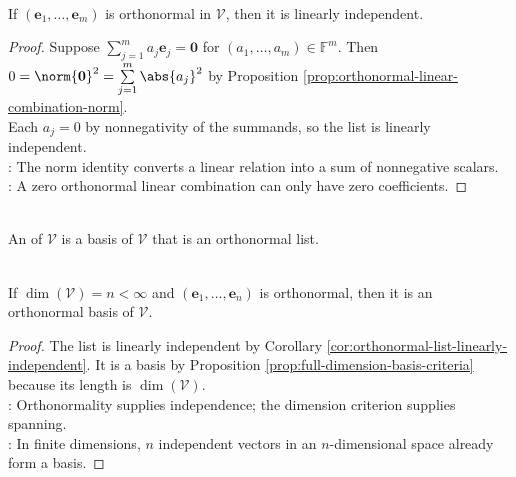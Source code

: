 \begin{corollary} \label{cor:orthonormal-list-linearly-independent} \\
If $(\mathbf{e}_1,\ldots,\mathbf{e}_m)$ is orthonormal in $\mathcal{V}$, then it is linearly independent.
\begin{proof}
Suppose $\sum\limits_{j=1}^{m}a_j\mathbf{e}_j=\mathbf{0}$ for $(a_1,\ldots,a_m)\in\mathbb{F}^m$. Then $0=\norm{\mathbf{0}}^2=\sum\limits_{j=1}^{m}\abs{a_j}^2$ by Proposition \ref{prop:orthonormal-linear-combination-norm}.\\
Each $a_j=0$ by nonnegativity of the summands, so the list is linearly independent.\\
: The norm identity converts a linear relation into a sum of nonnegative scalars.\\
: A zero orthonormal linear combination can only have zero coefficients.
\end{proof}
\end{corollary}

\begin{definition} \label{def:orthonormal-basis} \\
An  of $\mathcal{V}$ is a basis of $\mathcal{V}$ that is an orthonormal list.
\end{definition}

\begin{proposition} \label{prop:right-length-orthonormal-list-is-basis} \\
If $\dim(\mathcal{V})=n<\infty$ and $(\mathbf{e}_1,\ldots,\mathbf{e}_n)$ is orthonormal, then it is an orthonormal basis of $\mathcal{V}$.
\begin{proof}
The list is linearly independent by Corollary \ref{cor:orthonormal-list-linearly-independent}. It is a basis by Proposition \ref{prop:full-dimension-basis-criteria} because its length is $\dim(\mathcal{V})$.\\
: Orthonormality supplies independence; the dimension criterion supplies spanning.\\
: In finite dimensions, $n$ independent vectors in an $n$-dimensional space already form a basis.
\end{proof}
\end{proposition}

